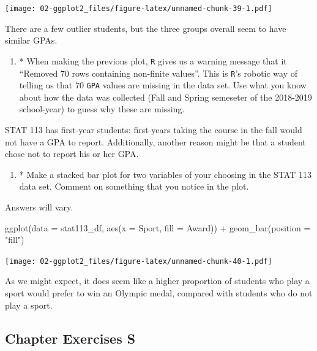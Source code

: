 \documentclass[
]{book}
\newenvironment{Shaded}{\begin{snugshade}}{\end{snugshade}}
\newcommand{\AttributeTok}[1]{\textcolor[rgb]{0.77,0.63,0.00}{#1}}
\newcommand{\FunctionTok}[1]{\textcolor[rgb]{0.00,0.00,0.00}{#1}}
\newcommand{\NormalTok}[1]{#1}
\newcommand{\SpecialCharTok}[1]{\textcolor[rgb]{0.00,0.00,0.00}{#1}}
\newcommand{\StringTok}[1]{\textcolor[rgb]{0.31,0.60,0.02}{#1}}
\providecommand{\tightlist}{%
  \setlength{\itemsep}{0pt}\setlength{\parskip}{0pt}}
\begin{document}
\texttt{[image: 02-ggplot2\_files/figure-latex/unnamed-chunk-39-1.pdf]}

There are a few outlier students, but the three groups overall seem to have similar GPAs.

\begin{enumerate}
\def\labelenumi{\arabic{enumi}.}
\setcounter{enumi}{2}
\tightlist
\item
  * When making the previous plot, \texttt{R} gives us a warning message that it ``Removed 70 rows containing non-finite values''. This is \texttt{R}'s robotic way of telling us that 70 \texttt{GPA} values are missing in the data set. Use what you know about how the data was collected (Fall and Spring semeseter of the 2018-2019 school-year) to guess why these are missing.
\end{enumerate}

STAT 113 has first-year students: first-years taking the course in the fall would not have a GPA to report. Additionally, another reason might be that a student chose not to report his or her GPA.

\begin{enumerate}
\def\labelenumi{\arabic{enumi}.}
\setcounter{enumi}{3}
\tightlist
\item
  * Make a stacked bar plot for two variables of your choosing in the STAT 113 data set. Comment on something that you notice in the plot.
\end{enumerate}

Answers will vary.

\begin{Shaded}
\begin{Highlighting}[]
\FunctionTok{ggplot}\NormalTok{(}\AttributeTok{data =}\NormalTok{ stat113\_df, }\FunctionTok{aes}\NormalTok{(}\AttributeTok{x =}\NormalTok{ Sport, }\AttributeTok{fill =}\NormalTok{ Award)) }\SpecialCharTok{+}
  \FunctionTok{geom\_bar}\NormalTok{(}\AttributeTok{position =} \StringTok{"fill"}\NormalTok{)}
\end{Highlighting}
\end{Shaded}

\texttt{[image: 02-ggplot2\_files/figure-latex/unnamed-chunk-40-1.pdf]}

As we might expect, it does seem like a higher proportion of students who play a sport would prefer to win an Olympic medal, compared with students who do not play a sport.

\hypertarget{chapexercise-2-S}{%
\subsection{Chapter Exercises S}\label{chapexercise-2-S}}
\end{document}

